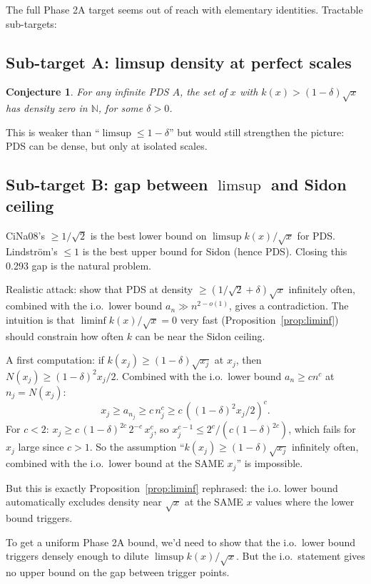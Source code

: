 \documentclass[11pt]{article}
\newtheorem{conjecture}{Conjecture}
\begin{document}
The full Phase 2A target seems out of reach with elementary
identities. Tractable sub-targets:

\subsection{Sub-target A: limsup density at perfect scales}

\begin{conjecture}\label{conj:scales}
For any infinite PDS $A$, the set of $x$ with $k(x) > (1-\delta)\sqrt x$
has density zero in $\mathbb{N}$, for some $\delta > 0$.
\end{conjecture}

This is weaker than ``$\limsup \leq 1 - \delta$'' but would still
strengthen the picture: PDS can be dense, but only at isolated scales.

\subsection{Sub-target B: gap between $\limsup$ and Sidon ceiling}

CiNa08's $\geq 1/\sqrt 2$ is the best lower bound on $\limsup
k(x)/\sqrt x$ for PDS. Lindstr\"om's $\leq 1$ is the best upper bound
for Sidon (hence PDS). Closing this 0.293 gap is the natural problem.

Realistic attack: show that PDS at density $\geq (1/\sqrt 2 + \delta)\sqrt x$
infinitely often, combined with the i.o.\ lower bound $a_n \gg n^{2-o(1)}$,
gives a contradiction. The intuition is that
$\liminf k(x)/\sqrt x = 0$ very fast (Proposition~\ref{prop:liminf})
should constrain how often $k$ can be near the Sidon ceiling.

A first computation: if $k(x_j) \geq (1 - \delta)\sqrt{x_j}$ at $x_j$,
then $N(x_j) \geq (1 - \delta)^2 x_j / 2$. Combined with the i.o.\ lower
bound $a_n \geq c n^c$ at $n_j = N(x_j)$:
\[
   x_j \geq a_{n_j} \geq c\, n_j^c \geq c\, ((1-\delta)^2 x_j/2)^c.
\]
For $c < 2$: $x_j \geq c\, (1-\delta)^{2c}\, 2^{-c}\, x_j^c$, so
$x_j^{c-1} \leq 2^c / (c (1-\delta)^{2c})$, which fails for $x_j$ large
since $c > 1$. So the assumption ``$k(x_j) \geq (1 - \delta)\sqrt{x_j}$
infinitely often, combined with the i.o.\ lower bound at the SAME $x_j$''
is impossible.

But this is exactly Proposition~\ref{prop:liminf} rephrased: the i.o.
lower bound automatically excludes density near $\sqrt x$ at the SAME
$x$ values where the lower bound triggers.

To get a uniform Phase 2A bound, we'd need to show that the i.o.\ lower
bound triggers densely enough to dilute $\limsup k(x)/\sqrt x$. But the
i.o.\ statement gives no upper bound on the gap between trigger points.
\end{document}
